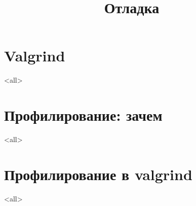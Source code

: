 

\title[Отладка]{Отладка}





\begin{frame}
	\frametitle{}
	\titlepage
	\vspace{-0.5cm}
	\begin{center}
	\end{center}
\end{frame}

\begin{frame}
	\tableofcontents
\end{frame}




\section{Valgrind}
\mode<all>{}

\section{Профилирование: зачем}
\mode<all>{}

\section{Профилирование в valgrind}
\mode<all>{}


